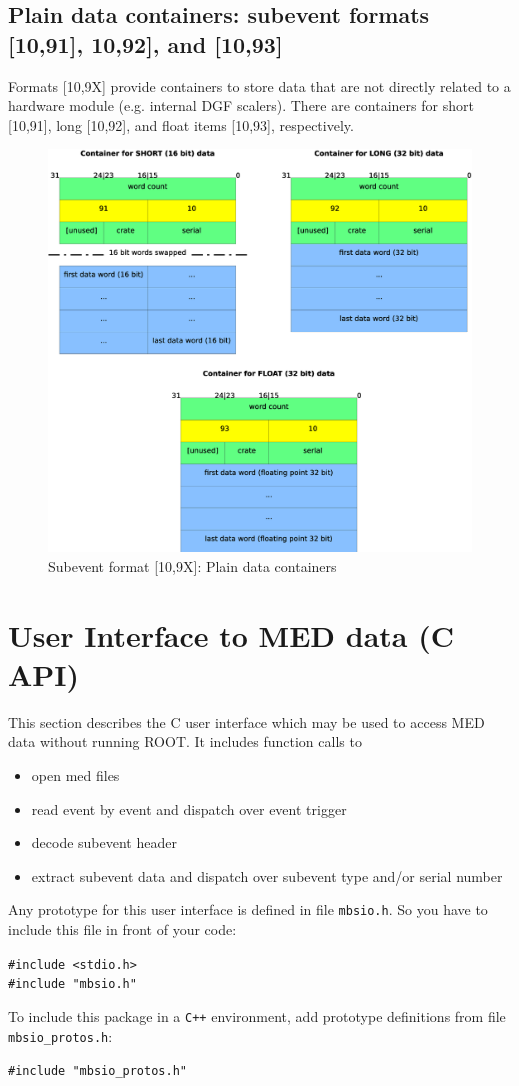 \documentclass[10pt,a4paper]{article}
\newenvironment{blueboxed}
	{\begin{Sbox}\begin{minipage}[t]}
	{\end{minipage}\end{Sbox}\colorbox{lightblue}{\TheSbox}}
\begin{document}
\subsection{Plain data containers: subevent formats [10,91], 10,92], and [10,93]}
Formats [10,9X] provide containers to store data that are not directly related to a hardware module
(e.g. internal DGF scalers).
There are containers for short [10,91], long [10,92], and float items [10,93], respectively.
\begin{figure}[H]
\centerline{\includegraphics[width=.5\linewidth]{MedSevt_Data_X}}
\caption{Subevent format [10,9X]: Plain data containers}
\label{MedSevt_Data_X}
\end{figure}
\newpage
\section{User Interface to MED data (C API)}
This section describes the C user interface which may be used to access MED data without running ROOT.
It includes function calls to
\begin{itemize}
	\item	open med files
	\item	read event by event and dispatch over event trigger
	\item	decode subevent header
	\item	extract subevent data and dispatch over subevent type and/or serial number
\end{itemize}
Any prototype for this user interface is defined in file \verb+mbsio.h+.
So you have to include this file in front of your code:
\begin{center}
\begin{blueboxed}{.3\linewidth}
	\verb+#include <stdio.h>+\\
	\verb+#include "mbsio.h"+
\end{blueboxed}
\end{center}
To include this package in a \texttt{C++} environment, add prototype definitions from file \verb+mbsio_protos.h+:\hfill
\begin{center}
\begin{blueboxed}{.3\linewidth}
	\verb+#include "mbsio_protos.h"+
\end{blueboxed}
\end{center}\vspace{5mm}
\end{document}

